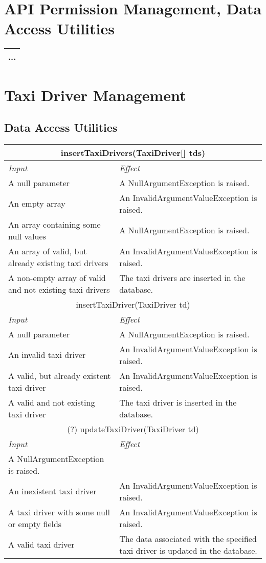 \documentclass[11pt,oneside,a4paper]{report}
\newcommand{\method}[1]{\multicolumn{2}{|c|}{{#1}}\\\hline
	\textit{Input} & \textit{Effect} \\\hline}
\begin{document}
\section{API Permission Management, Data Access Utilities}
\begin{tabular}{p{5cm}|p{6cm}}
	\hline
	\multicolumn{2}{c}{...}\\\hline
\end{tabular}


\section{Taxi Driver Management}
\subsection{Data Access Utilities}
\begin{tabular}{p{5cm}|p{6cm}}
	\hline
	\method{insertTaxiDrivers(TaxiDriver[] tds)}
	A null parameter &
	A NullArgumentException is raised.\\\hline
	An empty array &
	An InvalidArgumentValueException is raised.\\\hline
	An array containing some null values &
	A NullArgumentException is raised.\\\hline
	An array of valid, but already existing taxi drivers &
	An InvalidArgumentValueException  is raised. \\\hline
	A non-empty array of valid and not existing taxi drivers &
	The taxi drivers are inserted in the database. \ \\\hline\hline
	
	\method{insertTaxiDriver(TaxiDriver td)}
	A null parameter &
	A NullArgumentException is raised.\\\hline
	An invalid taxi driver &
	An InvalidArgumentValueException  is raised. \\\hline
	A valid, but already existent taxi driver &
	An InvalidArgumentValueException  is raised. \\\hline
	A valid and not existing taxi driver &
	The taxi driver is inserted in the database. \ \\\hline\hline

	\method{(?) updateTaxiDriver(TaxiDriver td)}
	A NullArgumentException is raised. \\\hline
	An inexistent taxi driver &
	An InvalidArgumentValueException is raised. \\\hline
	A taxi driver with some null or empty fields &
	An InvalidArgumentValueException is raised. \\\hline
	A valid taxi driver &
	The data associated with the specified taxi driver is updated in the database. \\\hline	
\end{tabular}
\end{document}
